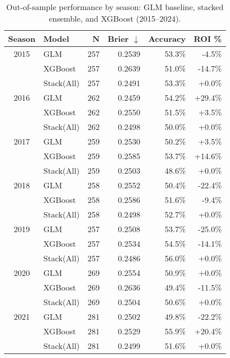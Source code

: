 \begin{table}[t]
  \centering
  \small
  \caption[Out-of-sample results by season]{Out-of-sample performance by season: GLM baseline, stacked ensemble, and XGBoost (2015--2024).}
  \label{tab:oos-record}
  \setlength{\tabcolsep}{2.5pt}\renewcommand{\arraystretch}{1.08}
  \begin{tabular}{@{} c l r r r r @{} }
    \toprule
    \textbf{Season}  & \textbf{Model}  & \textbf{N}  & \textbf{Brier $\downarrow$}  & \textbf{Accuracy}  & \textbf{ROI \%} \\
    \midrule
    2015 & GLM & 257 & 0.2539 & 53.3\% & -4.5\% \\
     & XGBoost & 257 & 0.2639 & 51.0\% & -14.7\% \\
     & Stack(All) & 257 & 0.2491 & 53.3\% & +0.0\% \\
    \midrule
    2016 & GLM & 262 & 0.2459 & 54.2\% & +29.4\% \\
     & XGBoost & 262 & 0.2550 & 51.5\% & +3.5\% \\
     & Stack(All) & 262 & 0.2498 & 50.0\% & +0.0\% \\
    \midrule
    2017 & GLM & 259 & 0.2530 & 50.2\% & +3.5\% \\
     & XGBoost & 259 & 0.2585 & 53.7\% & +14.6\% \\
     & Stack(All) & 259 & 0.2503 & 48.6\% & +0.0\% \\
    \midrule
    2018 & GLM & 258 & 0.2552 & 50.4\% & -22.4\% \\
     & XGBoost & 258 & 0.2586 & 51.6\% & -9.4\% \\
     & Stack(All) & 258 & 0.2498 & 52.7\% & +0.0\% \\
    \midrule
    2019 & GLM & 257 & 0.2508 & 53.7\% & -25.0\% \\
     & XGBoost & 257 & 0.2534 & 54.5\% & -14.1\% \\
     & Stack(All) & 257 & 0.2486 & 56.0\% & +0.0\% \\
    \midrule
    2020 & GLM & 269 & 0.2554 & 50.9\% & +0.0\% \\
     & XGBoost & 269 & 0.2636 & 49.4\% & -11.5\% \\
     & Stack(All) & 269 & 0.2504 & 50.6\% & +0.0\% \\
    \midrule
    2021 & GLM & 281 & 0.2502 & 49.8\% & -22.2\% \\
     & XGBoost & 281 & 0.2529 & 55.9\% & +20.4\% \\
     & Stack(All) & 281 & 0.2499 & 51.6\% & +0.0\% \\

\end{tabular}
\end{table}
